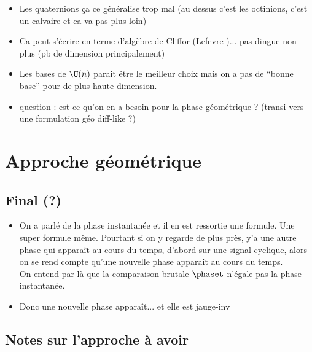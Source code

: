 \begin{itemize}
	\item Les quaternions ça ce généralise trop mal (au dessus c'est les octinions, c'est un calvaire et ca va pas plus loin)
	
	\item Ca peut s'écrire en terme d'algèbre de Cliffor (Lefevre \cite{lefevre_polarization_2021})... pas dingue non plus (pb de dimension principalement)
	
	\item Les bases de $\U(n)$ parait être le meilleur choix mais on a pas de ``bonne base'' pour de plus haute dimension.
	
	\item question : est-ce qu'on en a besoin pour la phase géométrique ? (transi vers une formulation géo diff-like ?)
\end{itemize}




\section{Approche géométrique}

\subsection{Final (?)}

\begin{itemize}
	\item On a parlé de la phase instantanée et il en est ressortie une formule. Une super formule même. Pourtant si on y regarde de plus près, y'a une autre phase qui apparaît au cours du temps, d'abord sur une signal cyclique, alors on se rend compte qu'une nouvelle phase apparait au cours du temps. 
	\\
	On entend par là que la comparaison brutale $\phaset$ n'égale pas la phase instantanée.
	
	\item Donc une nouvelle phase apparaît... et elle est jauge-inv 
	
\end{itemize}




\subsection{Notes sur l'approche à avoir}\label{subsec:phaseG_variete}

